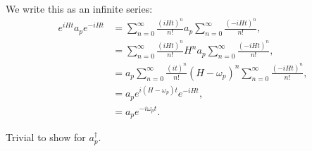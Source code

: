 \documentclass[working, oneside]{../../Preambles/tuftebook}
\begin{document}
\begin{solution}
We write this as an infinite series:
\begin{align*}
e^{iHt} a_p e^{-iHt} &= \sum_{n=0}^\infty \frac{(iHt)^n}{n!} a_p \sum_{n=0}^\infty \frac{(-iHt)^n}{n!}, \\
&= \sum_{n=0}^\infty \frac{(iHt)^n}{n!} H^n a_p \sum_{n=0}^\infty \frac{(-iHt)^n}{n!}, \\
&= a_p \sum_{n=0}^\infty \frac{(it)^n}{n!} (H - \omega_p)^n \sum_{n=0}^\infty \frac{(-iHt)^n}{n!}, \\
&= a_p e^{i(H - \omega_p)t} e^{-iHt}, \\
&= a_p e^{-i\omega_p t}.
\end{align*}

Trivial to show for \( a_p^\dagger \).
\end{solution}
\end{document}
